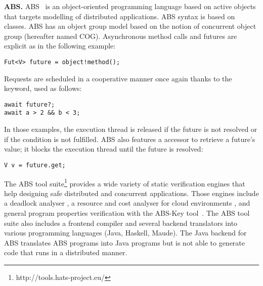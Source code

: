 \smallskip\noindent\textbf{ABS.}\label{abs}
ABS~\cite{ref:abs} is an object-oriented programming language based on active objects that targets
modelling of distributed applications. ABS syntax is based on classes.
ABS has an object group model
based on the notion of concurrent object
group (hereafter named COG). 
Asynchronous method calls and futures are explicit as in the following example:
\lstset{frame=single} 
\begin{lstlisting}
Fut<V> future = object!method();
\end{lstlisting}

Requests are scheduled in a cooperative manner once again thanks to the  keyword, used as follows:
\begin{lstlisting}
await future?;
await a > 2 && b < 3;
\end{lstlisting}
In those examples, the execution thread is released if the future is not resolved or if the condition is not fulfilled. 
ABS also features a  accessor to retrieve a future's value; it blocks the execution thread until the future
is resolved: 
\begin{lstlisting}
V v = future.get;
\end{lstlisting}	
The ABS tool
suite\footnote{http://tools.hats-project.eu/} provides a wide variety of static verification engines that help
designing safe distributed and concurrent applications. Those engines
include a deadlock analyser \cite{CGM:SoSym2014}, a resource and cost analyser for cloud environments 
\cite{SACO:TACAS14,ABSresourcescost}, and general program properties verification with the ABS-Key tool~\cite{ref:key,ref:noc-abs-key}.
The ABS tool suite also includes a frontend
compiler and several backend translators into various programming
languages (Java, Haskell, Maude). 
The Java backend for ABS translates ABS programs into Java programs but is not able to
generate code that runs in a distributed manner.



